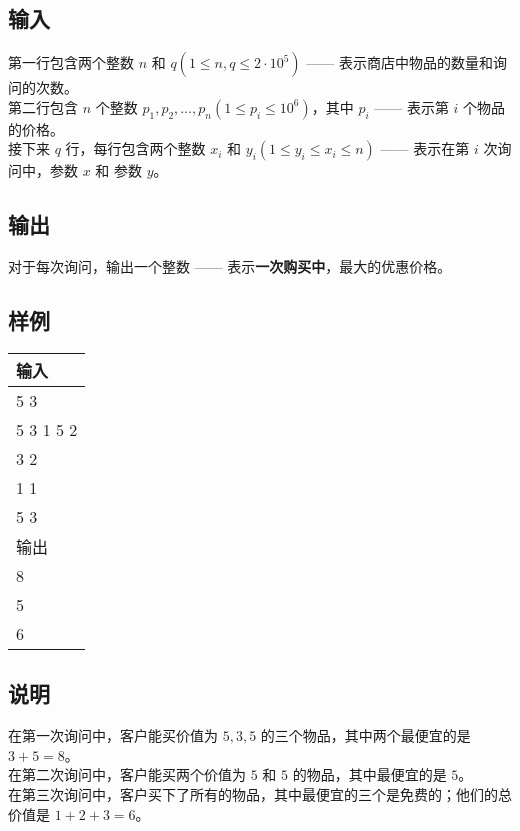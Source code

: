 \documentclass{article}
\begin{document}
\begin{CJK}{UTF8}{gbsn}
\subsection*{输入}

第一行包含两个整数 $n$ 和 $q(1\leq n, q \leq 2\cdot 10^5)$ —— 表示商店中物品的数量和询问的次数。\\

第二行包含 $n$ 个整数 $p_1, p_2, \dots, p_n(1\leq p_i \leq 10^6)$，其中 $p_i$ —— 表示第 $i$ 个物品的价格。\\

接下来 $q$ 行，每行包含两个整数 $x_i$ 和 $y_i(1\leq y_i\leq x_i\leq n)$ —— 表示在第 $i$ 次询问中，参数 $x$ 和 参数 $y$。

\subsection*{输出}

对于每次询问，输出一个整数 —— 表示\textbf{一次购买中}，最大的优惠价格。

\subsection*{样例}

\begin{tabular}{|L{11.5cm}|}
\hline
输入\\
\hline
{} 5 3\\
 5 3 1 5 2\\
 3 2\\
 1 1\\
 5 3\\
\hline
输出\\
\hline
{} 8\\
 5\\
 6\\
\hline
\end{tabular}

\subsection*{说明}

在第一次询问中，客户能买价值为 $5, 3, 5$ 的三个物品，其中两个最便宜的是 $3+5=8$。\\

在第二次询问中，客户能买两个价值为 $5$ 和 $5$ 的物品，其中最便宜的是 $5$。\\

在第三次询问中，客户买下了所有的物品，其中最便宜的三个是免费的；他们的总价值是 $1+2+3=6$。

\end{CJK}
\end{document}
